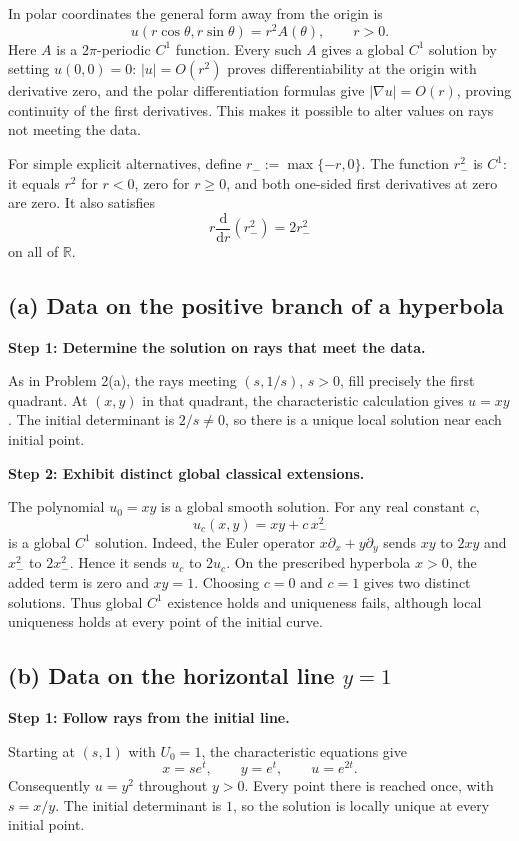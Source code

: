 \documentclass[11pt,a4paper]{article}
\newcommand{\R}{\mathbb R}
\newcommand{\step}[1]{\par\medskip\textbf{#1}\par}
\newcommand{\answer}[1]{\begin{equation*}\boxed{\displaystyle #1}\end{equation*}}
\begin{document}
In polar coordinates the general form away from the origin is
\[
 u(r\cos\theta,r\sin\theta)=r^2 A(\theta),\qquad r>0.
\]
Here $A$ is a $2\pi$-periodic $C^1$ function. Every such $A$ gives a global $C^1$ solution by setting $u(0,0)=0$: $|u|=O(r^2)$ proves differentiability at the origin with derivative zero, and the polar differentiation formulas give $|\nabla u|=O(r)$, proving continuity of the first derivatives. This makes it possible to alter values on rays not meeting the data.

For simple explicit alternatives, define $r_-:=\max\{-r,0\}$. The function $r_-^2$ is $C^1$: it equals $r^2$ for $r<0$, zero for $r\ge0$, and both one-sided first derivatives at zero are zero. It also satisfies
\[
 r\frac{\mathrm d}{\mathrm dr}(r_-^2)=2r_-^2
\]
on all of $\R$.

\subsection*{(a) Data on the positive branch of a hyperbola}
\step{Step 1: Determine the solution on rays that meet the data.}
As in Problem 2(a), the rays meeting $(s,1/s)$, $s>0$, fill precisely the first quadrant. At $(x,y)$ in that quadrant, the characteristic calculation gives $u=xy$. The initial determinant is $2/s\ne0$, so there is a unique local solution near each initial point.

\step{Step 2: Exhibit distinct global classical extensions.}
The polynomial $u_0=xy$ is a global smooth solution. For any real constant $c$,
\answer{u_c(x,y)=xy+c\,x_-^2}
is a global $C^1$ solution. Indeed, the Euler operator $x\partial_x+y\partial_y$ sends $xy$ to $2xy$ and $x_-^2$ to $2x_-^2$. Hence it sends $u_c$ to $2u_c$. On the prescribed hyperbola $x>0$, the added term is zero and $xy=1$. Choosing $c=0$ and $c=1$ gives two distinct solutions. Thus global $C^1$ existence holds and uniqueness fails, although local uniqueness holds at every point of the initial curve.

\subsection*{(b) Data on the horizontal line $y=1$}
\step{Step 1: Follow rays from the initial line.}
Starting at $(s,1)$ with $U_0=1$, the characteristic equations give
\[
 x=se^t,\qquad y=e^t,\qquad u=e^{2t}.
\]
Consequently $u=y^2$ throughout $y>0$. Every point there is reached once, with $s=x/y$. The initial determinant is $1$, so the solution is locally unique at every initial point.
\end{document}
